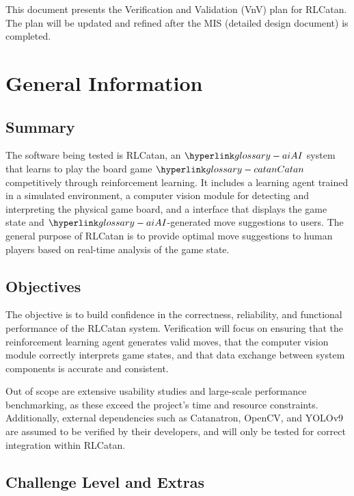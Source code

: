 \documentclass[12pt, titlepage]{article}
\begin{document}
\newpage


This document presents the Verification and Validation (VnV) plan for RLCatan. The plan will be updated and refined after the MIS (detailed design document) is completed.


\section{General Information}

\subsection{Summary}


  The software being tested is RLCatan,
 an $\AI{}$  system that learns to play the board game $\Catan{}$
 competitively through reinforcement learning. 
 It includes a learning agent trained in a simulated
  environment, a computer vision module for detecting 
  and interpreting the physical game board, and a
  interface that displays the game state and $\AI{}$-generated
  move suggestions to users. The general purpose of RLCatan
  is to provide optimal move suggestions to human players
  based on real-time analysis of the game state.

\subsection{Objectives}


The objective is to build confidence 
in the correctness, reliability, and functional performance of the RLCatan system.
 Verification will focus on ensuring that the reinforcement learning agent generates 
 valid moves, that the computer vision module correctly interprets game states, and 
 that data exchange between system components is accurate and consistent.

\medskip

 Out of scope are extensive usability studies and large-scale performance benchmarking,
 as these exceed the project’s time and resource constraints. Additionally, external
  dependencies such as Catanatron, OpenCV, and YOLOv9 are assumed to be verified by
   their developers, and will only be tested for correct integration within RLCatan.

\subsection{Challenge Level and Extras}
\end{document}
